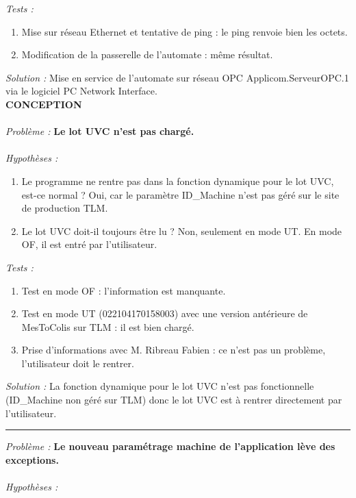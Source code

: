 \documentclass[a4paper,12pt]{extarticle}
\begin{document}
\emph{Tests :}

\begin{enumerate}[-]
    \item Mise sur réseau Ethernet et tentative de ping : le ping renvoie bien les octets.
    \item Modification de la passerelle de l’automate : même résultat.
\end{enumerate}

\emph{Solution :} Mise en service de l’automate sur réseau OPC Applicom.ServeurOPC.1 via le logiciel PC Network Interface.\\

\textbf{CONCEPTION}\\
\\
\emph{Problème :} \textbf{Le lot UVC n’est pas chargé.}\\
\\
\emph{Hypothèses :}

\begin{enumerate}[-]
    \item Le programme ne rentre pas dans la fonction dynamique pour le lot UVC, est-ce normal ? Oui, car le paramètre ID\_Machine n’est pas géré sur le site de production TLM.
    \item Le lot UVC doit-il toujours être lu ? Non, seulement en mode UT. En mode OF, il est entré par l'utilisateur.
\end{enumerate}

\emph{Tests :}

\begin{enumerate}[-]
    \item Test en mode OF : l'information est manquante.
    \item Test en mode UT (022104170158003) avec une version antérieure de MesToColis sur TLM : il est bien chargé.
    \item Prise d’informations avec M. Ribreau Fabien : ce n’est pas un problème, l’utilisateur doit le rentrer.
\end{enumerate}

\emph{Solution :} La fonction dynamique pour le lot UVC n’est pas fonctionnelle (ID\_Machine non géré sur TLM) donc le lot UVC est à rentrer directement par l’utilisateur.
\begin{center}
	\rule{8cm}{0.1pt}
\end{center}

\emph{Problème :} \textbf{Le nouveau paramétrage machine de l’application lève des exceptions.}\\
\\
\emph{Hypothèses :}
\end{document}
